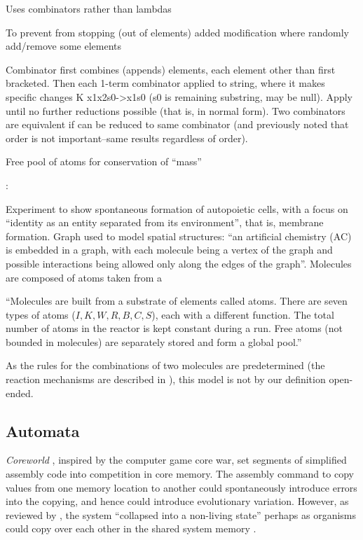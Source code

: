 \begin{NOTES}
Uses combinators rather than lambdas

To prevent from stopping (out of elements) added modification where randomly add/remove some elements

Combinator first combines (appends) elements, each element other than first bracketed. Then each 1-term combinator applied to string, where it makes specific changes \eg K x1x2s0-\textgreater{}x1s0 (s0 is remaining substring, may be null). Apply until no further reductions possible (that is, in normal form). Two combinators are equivalent if can be reduced to same combinator (and previously noted that order is not important--same results regardless of order).

Free pool of atoms for conservation of ``mass''

\parencite{Fenizio2001}:

Experiment to show spontaneous formation of autopoietic cells, with a focus on ``identity as an entity separated from its environment'', that is, membrane formation. Graph used to model spatial structures: ``an artificial chemistry (AC) is embedded in a graph, with each molecule being a vertex of the graph and possible interactions being allowed only along the edges of the graph''. Molecules are composed of atoms taken from a 

``Molecules are built from a substrate of elements called atoms. There are seven types of atoms ($I, K, W, R, B, C, S$), each with a different function. The total number of atoms in the reactor is kept constant during a run. Free atoms (not bounded in molecules) are separately stored and form a global pool.''

As the rules for the combinations of two molecules are predetermined (the reaction mechanisms are described in \cite{Fenizio2000}), this model is not by our definition open-ended.

\subsection{Automata}

\emph{Coreworld} \parencite{Rasmussen1990}, inspired by the computer game core war, set segments of simplified assembly code into competition in core memory. The assembly command to copy values from one memory location to another could spontaneously introduce errors into the copying, and hence could introduce evolutionary variation. However, as reviewed by \cite{Ofria2004}, the system ``collapsed into a non-living state'' perhaps as organisms could copy over each other in the shared system memory \parencite{Ofria2004}.


\end{NOTES}
